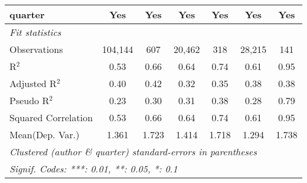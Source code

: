 \begin{tabular}{lcccccc}
   quarter                                                    & Yes           & Yes           & Yes           & Yes          & Yes           & Yes\\  
   \midrule
   \emph{Fit statistics}\\
   Observations                                               & 104,144       & 607           & 20,462        & 318          & 28,215        & 141\\  
   R$^2$                                                      & 0.53          & 0.66          & 0.64          & 0.74         & 0.61          & 0.95\\  
   Adjusted R$^2$                                             & 0.40          & 0.42          & 0.32          & 0.35         & 0.38          & 0.38\\  
   Pseudo R$^2$                                               & 0.23          & 0.30          & 0.31          & 0.38         & 0.28          & 0.79\\  
   Squared Correlation                                        & 0.53          & 0.66          & 0.64          & 0.74         & 0.61          & 0.95\\  
Mean(Dep. Var.) & 1.361 & 1.723 & 1.414 & 1.718 & 1.294 & 1.738 \\
   \midrule \midrule
   \multicolumn{7}{l}{\emph{Clustered (author \& quarter) standard-errors in parentheses}}\\
   \multicolumn{7}{l}{\emph{Signif. Codes: ***: 0.01, **: 0.05, *: 0.1}}\\
\end{tabular}
\par\endgroup
